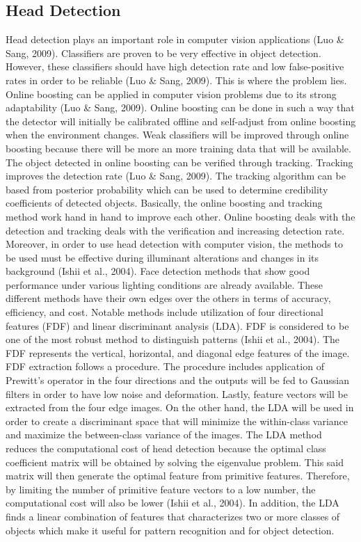 \subsection{Head Detection}
Head detection plays an important role in computer vision applications (Luo \& Sang, 2009). Classifiers are proven to be very effective in object detection. However, these classifiers should have high detection rate and low false-positive rates in order to be reliable (Luo \& Sang, 2009). This is where the problem lies. Online boosting can be applied in computer vision problems due to its strong adaptability (Luo \& Sang, 2009). Online boosting can be done in such a way that the detector will initially be calibrated offline and self-adjust from online boosting when the environment changes. Weak classifiers will be improved through online boosting because there will be more an more training data that will be available. The object detected in online boosting can be verified through tracking. Tracking improves the detection rate (Luo \& Sang, 2009). The tracking algorithm can be based from posterior probability which can be used to determine credibility coefficients of detected objects. Basically, the online boosting and tracking method work hand in hand to improve each other. Online boosting deals with the detection and tracking deals with the verification and increasing detection rate. Moreover, in order to use head detection with computer vision, the methods to be used must be effective during illuminant alterations and changes in its background (Ishii et al., 2004). Face detection methods that show good performance under various lighting conditions are already available. These different methods have their own edges over the others in terms of accuracy, efficiency, and cost. Notable methods include utilization of four directional features (FDF) and linear discriminant analysis (LDA). FDF is considered to be one of the most robust method to distinguish patterns (Ishii et al., 2004). The FDF represents the vertical, horizontal, and diagonal edge features of the image. FDF extraction follows a procedure. The procedure includes application of Prewitt’s operator in the four directions and the outputs will be fed to Gaussian filters in order to have low noise and deformation. Lastly, feature vectors will be extracted from the four edge images. On the other hand, the LDA will be used in order to create a discriminant space that will minimize the within-class variance and maximize the between-class variance of the images. The LDA method reduces the computational cost of head detection because the optimal class coefficient matrix will be obtained by solving the eigenvalue problem. This said matrix will then generate the optimal feature from primitive features. Therefore, by limiting the number of primitive feature vectors to a low number, the computational cost will also be lower (Ishii et al., 2004). In addition, the LDA finds a linear combination of features that characterizes two or more classes of objects which make it useful for pattern recognition and for object detection.


